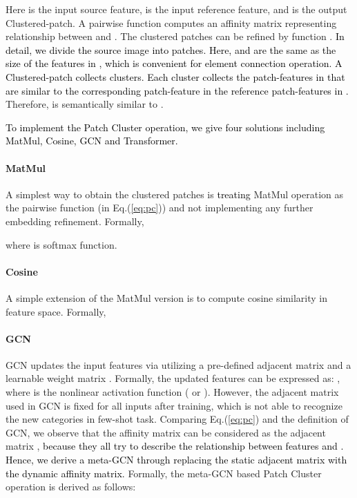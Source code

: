 \documentclass{article}
\newcommand{\seasons}[1]{\textcolor{black}{#1}}
\begin{document}
Here  is the input source feature,  is the input reference feature, and  is the output Clustered-patch. A pairwise function  computes an affinity matrix representing relationship between  and . The clustered patches can be refined by function .
\seasons{
In detail, we divide the source image into  patches.
Here,  and  are the same as the size of the features in , which is convenient for element connection operation.
A Clustered-patch  collects  clusters.
Each cluster collects the patch-features in  that are similar to the corresponding patch-feature in the reference patch-features in .}
Therefore,  is semantically similar to .

\seasons{To implement the Patch Cluster operation, we give four solutions including MatMul, Cosine, GCN and Transformer.}

\paragraph{MatMul}
A simplest way to obtain the clustered patches is \seasons{treating} MatMul operation as the pairwise function  (in Eq.(\ref{eq:pc})) and not implementing any further embedding refinement. Formally,
\begin{small}

\end{small}where  is softmax function.

\paragraph{Cosine}
A simple extension of the MatMul version is to compute cosine similarity in feature space. Formally,
\begin{small}

\end{small}

\paragraph{GCN}
GCN \cite{kipf2017semi} updates the input features  via utilizing a pre-defined adjacent matrix  and a learnable weight matrix .
Formally, the updated features  can be expressed as: , where  is the nonlinear activation function ( or ).
However, the adjacent matrix  used in GCN is fixed for all inputs after training, which is not able to recognize the new categories in few-shot task. Comparing Eq.(\ref{eq:pc}) and the definition of GCN, we observe that the affinity matrix  can be considered as the adjacent matrix ,  \seasons{because they all try to describe the relationship between features  and .}
\seasons{Hence, we derive a meta-GCN through replacing the static adjacent matrix with the dynamic affinity matrix.}
Formally, the meta-GCN based Patch Cluster operation is derived as follows:
\begin{small}

\end{small}
\end{document}
